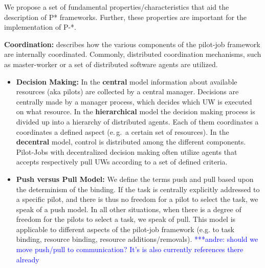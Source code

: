 \documentclass[conference,final]{IEEEtran}
\newcommand{\alnote}[1]{ {\textcolor{blue} { ***andre: #1 }}}
\newcommand{\alnote}[1]{}
\begin{document}
We propose a set of fundamental properties/characteristics that aid the 
description of P* frameworks. Further, these properties are important for the 
implementation of P-*.

\textbf{Coordination:} describes how the various components of the 
pilot-job framework are internally coordinated. Commonly, 
distributed coordination mechanisms, such as master-worker or a 
set of distributed software agents are utilized.
     \begin{itemize}
     			\item \textbf{Decision Making:} In the \textbf{central} model 
				information about available resources (aka 	pilots) are 
				collected by a central manager.  Decisions are centrally 
     			made by a manager process, which decides which UW is executed on 
				what resource. In the \textbf{hierarchical} 
				model the decision making process is divided up into a hierarchy 	
				of distributed agents. Each of them coordinates a coordinates a 
				defined aspect (e.\,g.\ a certain set of resources). In the 
				\textbf{decentral} model, control is distributed among the 
     			different components. Pilot-Jobs with decentralized decision 
     			making often utilize agents that accepts respectively pull 
     			UWs according to a set of defined criteria.

				\item \textbf{Push versus Pull Model:} We define the terms push 
				and pull based upon the determinism of the binding. If
				the task is centrally explicitly addressed to a specific pilot, 
				and there is thus no freedom for a pilot to select the task, we 
				speak of a push model. In all other situations, when there is a 
				degree of freedom for the pilots to select a task, we speak of 
				pull. This model is applicable to different aspects of the 
				pilot-job framework (e.g. to task binding, resource binding, 
				resource additions/removals).    \alnote{should we move 
				push/pull to communication? It's is also currently references 
				there already}     		
     \end{itemize}
	 
\end{document}
